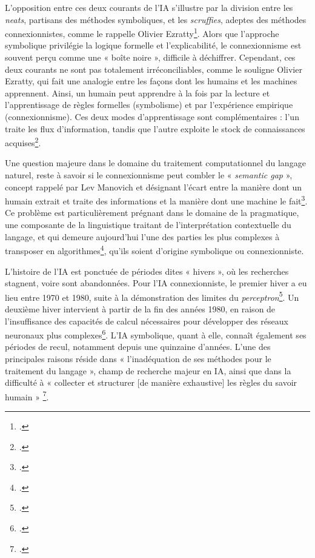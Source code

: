 \newline

L'opposition entre ces deux courants de l'IA s'illustre par la division entre les \textit{neats}, partisans des méthodes symboliques, et les \textit{scruffies}, adeptes des méthodes connexionnistes, comme le rappelle Olivier Ezratty\footcite{ezratty_que_nodate}. Alors que l'approche symbolique privilégie la logique formelle et l'explicabilité, le connexionnisme est souvent perçu comme une « boîte noire », difficile à déchiffrer. Cependant, ces deux courants ne sont pas totalement irréconciliables, comme le souligne Olivier Ezratty, qui fait une analogie entre les façons dont les humains et les machines apprennent. Ainsi, un humain peut apprendre à la fois par la lecture et l’apprentissage de règles formelles (symbolisme) et par l'expérience empirique (connexionnisme). Ces deux modes d'apprentissage sont complémentaires : l'un traite les flux d'information, tandis que l'autre exploite le stock de connaissances acquises\footcite{ezratty_que_nodate}.

\newline

Une question majeure dans le domaine du traitement computationnel du langage naturel, reste à savoir si le connexionnisme peut combler le « \textit{semantic gap} », concept rappelé par Lev Manovich et désignant l'écart entre la manière dont un humain extrait et traite des informations et la manière dont une machine le fait\footcite[p.22]{manovich_data_2015}. Ce problème est particulièrement prégnant dans le domaine de la pragmatique, une composante de la linguistique traitant de l'interprétation contextuelle du langage, et qui demeure aujourd'hui l'une des parties les plus complexes à transposer en algorithmes\footcite[p.19]{yvon_petite_2007}, qu’ils soient d’origine symbolique ou connexionniste.

\newline

L'histoire de l'IA est ponctuée de périodes dites « hivers », où les recherches stagnent, voire sont abandonnées. Pour l'IA connexionniste, le premier hiver a eu lieu entre 1970 et 1980, suite à la démonstration des limites du \textit{perceptron}\footcite{saporta_breve_2018}. Un deuxième hiver intervient à partir de la fin des années 1980, en raison de l'insuffisance des capacités de calcul nécessaires pour développer des réseaux neuronaux plus complexes\footcite{saporta_breve_2018}.
L'IA symbolique, quant à elle, connaît également ses périodes de recul, notamment depuis une quinzaine d’années. L'une des principales raisons réside dans « l'inadéquation de ses méthodes pour le traitement du langage », champ de recherche majeur en IA, ainsi que dans la difficulté à « collecter et structurer [de manière exhaustive] les règles du savoir humain » \footcite{ezratty_que_nodate}.

